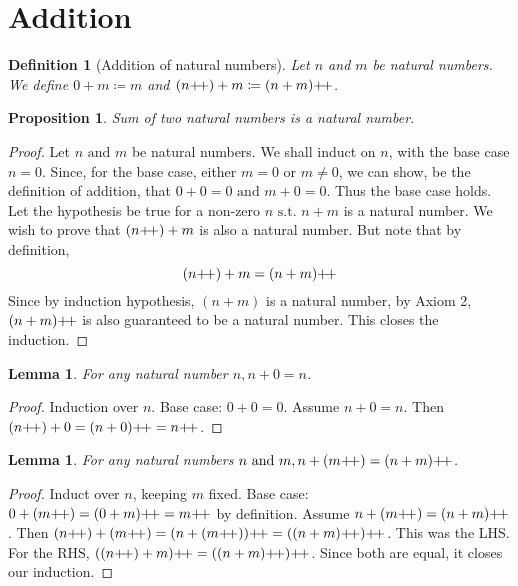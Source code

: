 \documentclass[12pt]{article}
\newtheorem{lemma}[theorem]{Lemma}
\newtheorem{proposition}{Proposition}[section]
\newtheorem{definition}{Definition}[section]
\theoremstyle{remark}
\begin{document}
\section{Addition}%
\label{sec:Addition}

\begin{definition}[Addition of natural numbers]
    Let $ n $ and $ m $ be natural numbers. We define $ 0 + m \coloneqq m$ and $ (n\inc) + m \coloneqq (n+m)\inc $.
\end{definition}

\begin{proposition}
    Sum of two natural numbers is a natural number.
\end{proposition}

\begin{proof}
	Let $ n \text{ and } m $ be natural numbers. We shall induct on $ n $, with the base case $ n = 0 $. Since, for the base case, either $ m = 0 \text{ or } m \neq 0 $, we can show, be the definition of addition, that $ 0 + 0 = 0 \text{ and } m + 0 = 0 $. Thus the base case holds. 
	Let the hypothesis be true for a non-zero $ n \text{ s.t. } n+m $ is a natural number. We wish to prove that $ (n\inc)+m $ is also a natural number. But note that by definition,
	\begin{equation*}
		(n\inc)+m = (n+m)\inc
	\end{equation*}
	Since by induction hypothesis, $ (n+m) $ is a natural number, by Axiom 2, $ (n+m)\inc $ is also guaranteed to be a natural number. This closes the induction. 
\end{proof}

\begin{lemma}
   For any natural number $ n, n+0 = n $. 
\end{lemma}

\begin{proof}
	Induction over $ n $. Base case: $ 0 + 0 = 0 $. Assume $ n + 0 = n $. Then $ (n\inc)+0 = (n+0)\inc = n\inc $. 
\end{proof}

\begin{lemma}
    For any natural numbers $ n \text{ and } m, n+(m\inc) = (n+m)\inc$. 
\end{lemma}

\begin{proof}
	Induct over $ n $, keeping $ m $ fixed. Base case: $ 0+(m\inc) = (0+m)\inc = m\inc$ by definition. Assume $ n + (m\inc) = (n+m)\inc $. Then $ (n\inc) + (m\inc) = (n+(m\inc))\inc = ((
	n+m)\inc)\inc$. This was the LHS. For the RHS, $ ((n\inc) + m)\inc = ((n+m)\inc)\inc $. Since both are equal, it closes our induction. 
\end{proof}
\end{document}
